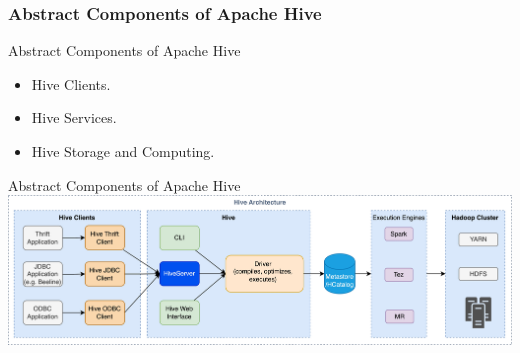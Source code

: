 
\subsubsection{Abstract Components of Apache Hive}

\begin{frame}{Abstract Components of Apache Hive}
	\begin{itemize}
		\item Hive Clients.
		\item Hive Services.
		\item Hive Storage and Computing.
	\end{itemize}
	\end{frame}
	
\begin{frame}{Abstract Components of Apache Hive}
	\includegraphics[width=\linewidth,height=.8\textheight]{./Figures/chapter-03/Hive_Architecture.jpg}
\end{frame}
	

